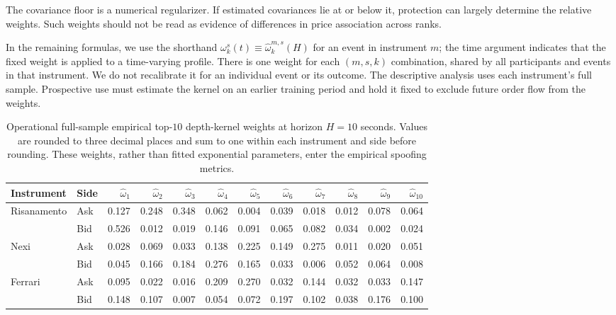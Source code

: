 \documentclass[11pt]{article}
\begin{document}
The covariance floor is a numerical regularizer. If estimated covariances lie at or below it, protection can largely
determine the relative weights. Such weights should not be read as evidence of differences in price association across ranks.

In the remaining formulas, we use the shorthand
$\omega^{s}_{k}(t)\equiv\widehat\omega^{m,s}_{k}(H)$ for an event in instrument $m$; the time argument indicates that the
fixed weight is applied to a time-varying profile. There is one weight for each $(m,s,k)$ combination, shared by all
participants and events in that instrument. We do not recalibrate it for an individual event or its outcome.
The descriptive analysis uses each instrument's full sample. Prospective use must estimate the kernel on an earlier
training period and hold it fixed to exclude future order flow from the weights.

\begin{table}[htbp]
\centering
\caption{Operational full-sample empirical top-$10$ depth-kernel weights at horizon $H=10$ seconds. Values are rounded to
three decimal places and sum to one within each instrument and side before rounding. These weights, rather than fitted
exponential parameters, enter the empirical spoofing metrics.}
\label{tab:empirical_depth_kernel_calibration}
\scriptsize
\setlength{\tabcolsep}{1.7pt}
\begin{tabular}{ll*{10}{r}}
\toprule
Instrument & Side & $\widehat\omega_1$ & $\widehat\omega_2$ & $\widehat\omega_3$ & $\widehat\omega_4$ & $\widehat\omega_5$ & $\widehat\omega_6$ & $\widehat\omega_7$ & $\widehat\omega_8$ & $\widehat\omega_9$ & $\widehat\omega_{10}$ \\
\midrule
Risanamento & Ask & 0.127 & 0.248 & 0.348 & 0.062 & 0.004 & 0.039 & 0.018 & 0.012 & 0.078 & 0.064 \\
             & Bid & 0.526 & 0.012 & 0.019 & 0.146 & 0.091 & 0.065 & 0.082 & 0.034 & 0.002 & 0.024 \\
Nexi        & Ask & 0.028 & 0.069 & 0.033 & 0.138 & 0.225 & 0.149 & 0.275 & 0.011 & 0.020 & 0.051 \\
             & Bid & 0.045 & 0.166 & 0.184 & 0.276 & 0.165 & 0.033 & 0.006 & 0.052 & 0.064 & 0.008 \\
Ferrari     & Ask & 0.095 & 0.022 & 0.016 & 0.209 & 0.270 & 0.032 & 0.144 & 0.032 & 0.033 & 0.147 \\
             & Bid & 0.148 & 0.107 & 0.007 & 0.054 & 0.072 & 0.197 & 0.102 & 0.038 & 0.176 & 0.100 \\
\bottomrule
\end{tabular}
\end{table}
\end{document}
